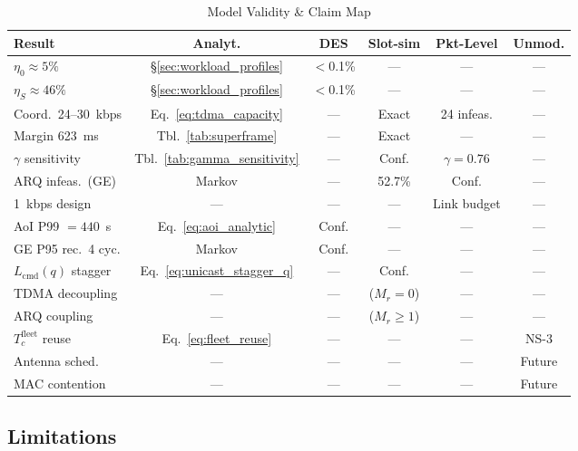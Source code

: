 \documentclass[journal]{IEEEtran}
\begin{document}
\begin{table}[t]
    \centering
    \caption{Model Validity \& Claim Map}
    \label{tab:claim_map}
    \footnotesize
    \begin{tabular}{@{}lccccc@{}}
        \toprule
        \textbf{Result} & \textbf{Analyt.} & \textbf{DES} & \textbf{Slot-sim} & \textbf{Pkt-Level} & \textbf{Unmod.} \\
        \midrule
        $\eta_0 \approx 5\%$ & \S\ref{sec:workload_profiles} & $<$0.1\% & --- & --- & --- \\
        $\eta_S \approx 46\%$ & \S\ref{sec:workload_profiles} & $<$0.1\% & --- & --- & --- \\
        Coord.\ 24--30~kbps & Eq.~\ref{eq:tdma_capacity} & --- & Exact & 24 infeas. & --- \\
        Margin 623~ms & Tbl.~\ref{tab:superframe} & --- & Exact & --- & --- \\
        $\gamma$ sensitivity & Tbl.~\ref{tab:gamma_sensitivity} & --- & Conf. & $\gamma\!=\!0.76$ & --- \\
        ARQ infeas.\ (GE) & Markov & --- & 52.7\% & Conf. & --- \\
        1~kbps design & --- & --- & --- & Link budget & --- \\
        AoI P99 $= 440$~s & Eq.~\ref{eq:aoi_analytic} & Conf. & --- & --- & --- \\
        GE P95 rec.\ 4 cyc. & Markov & Conf. & --- & --- & --- \\
        $L_{\text{cmd}}(q)$ stagger & Eq.~\ref{eq:unicast_stagger_q} & --- & Conf. & --- & --- \\
        TDMA decoupling & --- & --- & ($M_r\!=\!0$) & --- & --- \\
        ARQ coupling & --- & --- & ($M_r\!\geq\!1$) & --- & --- \\
        $T_c^{\text{fleet}}$ reuse & Eq.~\ref{eq:fleet_reuse} & --- & --- & --- & NS-3 \\
        Antenna sched. & --- & --- & --- & --- & Future \\
        MAC contention & --- & --- & --- & --- & Future \\
        \bottomrule
    \end{tabular}
\end{table}

\subsection{Limitations}
\label{sec:limitations}
\end{document}
